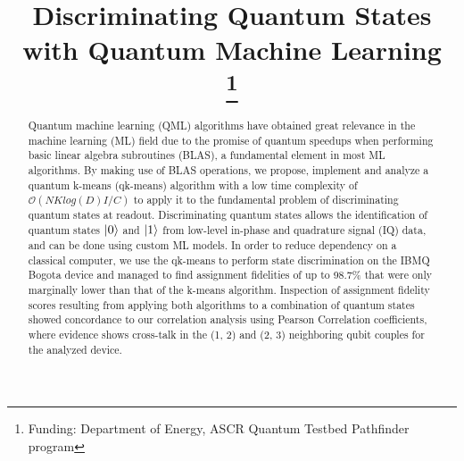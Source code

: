 \documentclass[conference]{IEEEtran}
\begin{document}
\title{Discriminating Quantum States with Quantum Machine Learning\\
\thanks{Funding: Department of Energy, ASCR Quantum Testbed Pathfinder program}
}

\author{
\and
{}
\and
{}
}

\maketitle

\begin{abstract}
Quantum machine learning (QML) algorithms have obtained great relevance in the machine learning (ML) field due to the promise of quantum speedups when performing basic linear algebra subroutines (BLAS), a fundamental element in most ML algorithms. By making use of BLAS operations, we propose, implement and analyze a quantum k-means (qk-means) algorithm with a low time complexity of \(\mathcal{O}(NKlog(D)I/C)\) to apply it to the fundamental problem of discriminating quantum states at readout. Discriminating quantum states allows the identification of quantum states \(\ket{0}\) and \(\ket{1}\) from low-level in-phase and quadrature signal (IQ) data, and can be done using custom ML models. In order to reduce dependency on a classical computer, we use the qk-means to perform state discrimination on the IBMQ Bogota device and managed to find assignment fidelities of up to 98.7\% that were only marginally lower than that of the k-means algorithm. Inspection of assignment fidelity scores resulting from applying both algorithms to a combination of quantum states showed concordance to our correlation analysis using Pearson Correlation coefficients, where evidence shows cross-talk in the (1, 2) and (2, 3) neighboring qubit couples for the analyzed device.
\end{abstract}
\end{document}
